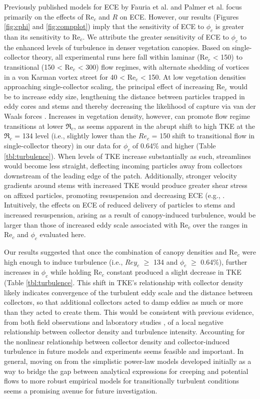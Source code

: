 \documentclass[geosciences,article,submit,moreauthors,pdftex]{Definitions/mdpi}
\newcommand\Rey{\mathrm{Re}}
\begin{document}
Previously published models for ECE by Fauria et al. \citeyear{Fauria_2015} and Palmer et al. \citeyear{Palmer_2004} focus primarily on the effects of $\Rey_c$ and $R$ on ECE. However, our results (Figures \ref{fig:cphi} and \ref{fig:compplot}) imply that the sensitivity of ECE to $\phi_c$ is greater than its sensitivity to $\Rey_c$. We attribute the greater sensitivity of ECE to $\phi_c$ to the enhanced levels of turbulence in denser vegetation canopies. Based on single-collector theory, all experimental runs here fall within laminar ($\Rey_c$ < 150) to transitional (150 < $\Rey_c$ < 300) flow regimes, with alternate shedding of vortices in a von Karman vortex street for 40 < $\Rey_c$ < 150. At low vegetation densities approaching single-collector scaling, the principal effect of increasing $\Rey_c$ would be to increase eddy size, lengthening the distance between particles trapped in eddy cores and stems and thereby decreasing the likelihood of capture via van der Waals forces \cite{durham2013turbulence}. Increases in vegetation density, however, can promote flow regime transitions at lower $\Re_c$, as seems apparent in the abrupt shift to high TKE at the $\Re_c$ = 134 level (i.e., slightly lower than the $Re_c$ = 150 shift to transitional flow in single-collector theory) in our data for $\phi_c$ of 0.64\% and higher (Table \ref{tbl:turbulence}). When levels of TKE increase substantially as such, streamlines would become less straight, deflecting incoming particles away from collectors downstream of the leading edge of the patch. Additionally, stronger velocity gradients around stems with increased TKE would produce greater shear stress on affixed particles, promoting resuspension and decreasing ECE (e.g., \cite{Fauria_2015}. Intuitively, the effects on ECE of reduced delivery of particles to stems and increased resuspension, arising as a result of canopy-induced turbulence, would be larger than those of increased eddy scale associated with $\Rey_c$ over the ranges in $\Rey_c$ and $\phi_c$ evaluated here.

Our results suggested that once the combination of canopy densities and $\Rey_c$ were high enough to induce turbulence (i.e., $Rey_c$ $\geq$ 134 and $\phi_c$ $\geq$ 0.64\%), further increases in $\phi_c$ while holding $\Rey_c$ constant produced a slight decrease in TKE (Table \ref{tbl:turbulence}. This shift in TKE's relationship with collector density likely indicates convergence of the turbulent eddy scale and the distance between collectors, so that additional collectors acted to damp eddies as much or more than they acted to create them. This would be consistent with previous evidence, from both field observations \cite{leonard1995flow} and laboratory studies \cite{nepf_drag_1999, purich2006capture}, of a local negative relationship between collector density and turbulence intensity. Accounting for the nonlinear relationship between collector density and collector-induced turbulence in future models and experiments seems feasible and important. In general, moving on from the simplistic power-law models developed initially as a way to bridge the gap between analytical expressions for creeping and potential flows to more robust empirical models for transitionally turbulent conditions \cite{stein2021} seems a promising avenue for future investigation.
\end{document}
